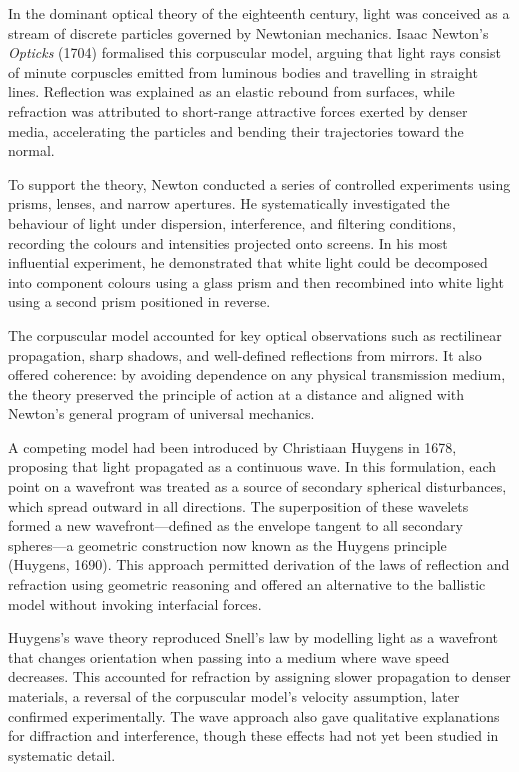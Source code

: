 In the dominant optical theory of the eighteenth century, light was conceived as a stream of discrete particles governed by Newtonian mechanics. Isaac Newton's \textit{Opticks} (1704) formalised this corpuscular model, arguing that light rays consist of minute corpuscles emitted from luminous bodies and travelling in straight lines. Reflection was explained as an elastic rebound from surfaces, while refraction was attributed to short-range attractive forces exerted by denser media, accelerating the particles and bending their trajectories toward the normal.

To support the theory, Newton conducted a series of controlled experiments using prisms, lenses, and narrow apertures. He systematically investigated the behaviour of light under dispersion, interference, and filtering conditions, recording the colours and intensities projected onto screens. In his most influential experiment, he demonstrated that white light could be decomposed into component colours using a glass prism and then recombined into white light using a second prism positioned in reverse.

The corpuscular model accounted for key optical observations such as rectilinear propagation, sharp shadows, and well-defined reflections from mirrors. It also offered coherence: by avoiding dependence on any physical transmission medium, the theory preserved the principle of action at a distance and aligned with Newton's general program of universal mechanics.

A competing model had been introduced by Christiaan Huygens in 1678, proposing that light propagated as a continuous wave. In this formulation, each point on a wavefront was treated as a source of secondary spherical disturbances, which spread outward in all directions. The superposition of these wavelets formed a new wavefront—defined as the envelope tangent to all secondary spheres—a geometric construction now known as the Huygens principle (Huygens, 1690). This approach permitted derivation of the laws of reflection and refraction using geometric reasoning and offered an alternative to the ballistic model without invoking interfacial forces.

Huygens's wave theory reproduced Snell's law by modelling light as a wavefront that changes orientation when passing into a medium where wave speed decreases. This accounted for refraction by assigning slower propagation to denser materials, a reversal of the corpuscular model's velocity assumption, later confirmed experimentally. The wave approach also gave qualitative explanations for diffraction and interference, though these effects had not yet been studied in systematic detail.

